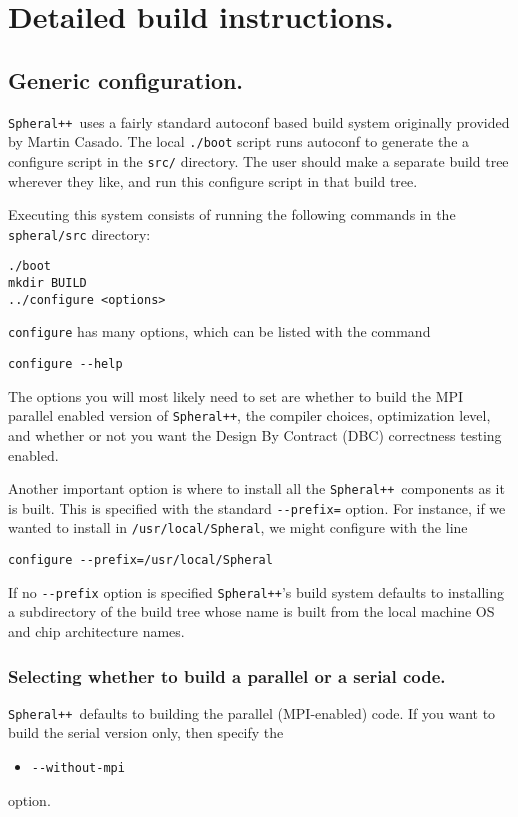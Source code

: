 \documentclass{article}
\newcommand{\Spheral}{{\tt Spheral++}}
\begin{document}
\section{Detailed build instructions.}

\subsection{Generic configuration.}
\Spheral\ uses a fairly standard autoconf based build system originally provided by Martin Casado.  The local {\tt ./boot} script runs autoconf to generate the a configure script in the {\tt src/} directory.  The user should make a separate build tree wherever they like, and run this configure script in that build tree.

Executing this system consists of running the following commands in the {\tt spheral/src} directory:
\begin{verbatim}
./boot
mkdir BUILD
../configure <options>
\end{verbatim}
{\tt configure} has many options, which can be listed with the command
\begin{verbatim}
configure --help
\end{verbatim}
The options you will most likely need to set are whether to build the MPI parallel enabled version of \Spheral, the compiler choices, optimization level, and whether or not you want the Design By Contract (DBC) correctness testing enabled.

Another important option is where to install all the \Spheral\ components as it is built.  This is specified with the standard \verb.--prefix=. option.  For instance, if we wanted to install in {\tt /usr/local/Spheral}, we might configure with the line
\begin{verbatim}
configure --prefix=/usr/local/Spheral
\end{verbatim}
If no \verb.--prefix. option is specified \Spheral's build system defaults to installing a subdirectory of the build tree whose name is built from the local machine OS and chip architecture names.

\subsubsection{Selecting whether to build a parallel or a serial code.}
\Spheral\ defaults to building the parallel (MPI-enabled) code.  If you want to
build the serial version only, then specify the
\begin{itemize}
\item\verb+--without-mpi+
\end{itemize}
option.
\end{document}

